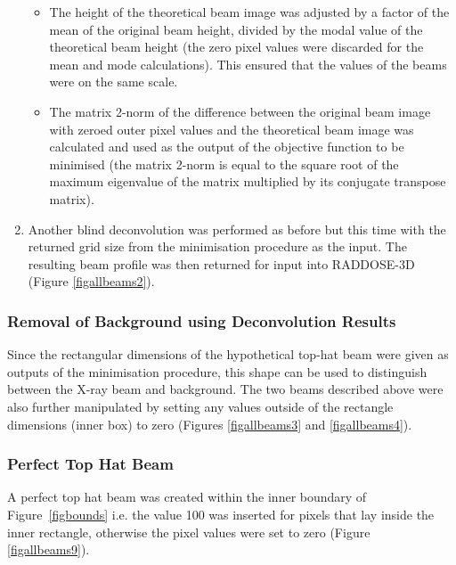 \begin{enumerate}
\begin{itemize}
\item The height of the theoretical beam image was adjusted by a factor of the mean of the original beam height, divided by the modal value of the theoretical beam height (the zero pixel values were discarded for the mean and mode calculations).
This ensured that the values of the beams were on the same scale.
\item The matrix 2-norm of the difference between the original beam image with zeroed outer pixel values and the theoretical beam image was calculated and used as the output of the objective function to be minimised (the matrix 2-norm is equal to the square root of the maximum eigenvalue of the matrix multiplied by its conjugate transpose matrix).
\end{itemize}
\item Another blind deconvolution was performed as before but this time with the returned grid size from the minimisation procedure as the input.
The resulting beam profile was then returned for input into RADDOSE-3D (Figure \ref{figallbeams2}).
\end{enumerate}

\subsubsection{Removal of Background using Deconvolution Results}
Since the rectangular dimensions of the hypothetical top-hat beam were given as outputs of the minimisation procedure, this shape can be used to distinguish between the X-ray beam and background.
The two beams described above were also further manipulated by setting any values outside of the rectangle dimensions (inner box) to zero (Figures \ref{figallbeams3} and \ref{figallbeams4}).

\subsubsection{Perfect Top Hat Beam}
A perfect top hat beam was created within the inner boundary of Figure~\ref{figbounds}  i.e. the value 100 was inserted for pixels that lay inside the inner rectangle, otherwise the pixel values were set to zero (Figure \ref{figallbeams9}).

